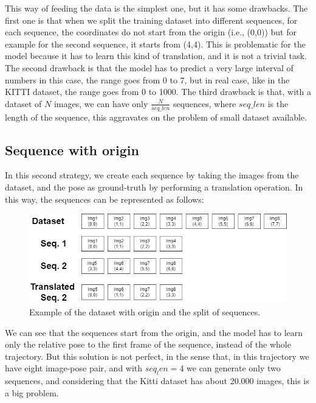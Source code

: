 This way of feeding the data is the simplest one, but it has some drawbacks.
The first one is that when we split the training dataset into different sequences, for each sequence, the coordinates do not start from the origin (i.e., (0,0)) but for example for the second sequence, it starts from (4,4).
This is problematic for the model because it has to learn this kind of translation, and it is not a trivial task.
The second drawback is that the model has to predict a very large interval of numbers in this case, the range goes from 0 to 7, but in real case, like in the KITTI dataset, the range goes from 0 to 1000.
The third drawback is that, with a dataset of $N$ images, we can have only $\frac{N}{seq\_len}$ sequences, where $seq\_len$ is the length of the sequence, this aggravates on the problem of small dataset available.


\subsection{Sequence with origin}\label{subsec:sequence-with-origin}
In this second strategy, we create each sequence by taking the images from the dataset, and the pose as ground-truth by performing a translation operation.
In this way, the sequences can be represented as follows:
\begin{figure}[H]
    \centering
    \includegraphics[width=\textwidth]{images/4_2_split_traj_1}
    \caption{Example of the dataset with origin and the split of sequences.}
    \label{fig:example-of-dataset-with-origin}
\end{figure}
We can see that the sequences start from the origin, and the model has to learn only the relative pose to the first frame of the sequence, instead of the whole trajectory.
But this solution is not perfect, in the sense that, in this trajectory we have eight image-pose pair, and with $seq_len = 4$ we can generate only two sequences, and considering that the Kitti dataset has about 20.000 images, this is a big problem.

